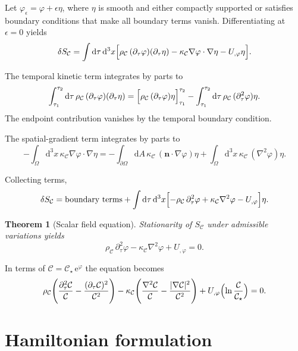 \documentclass[11pt,a4paper]{article}
\newtheorem{theorem}[axiom]{Theorem}
\newcommand{\C}{\mathcal{C}}
\newcommand{\Cs}{\mathcal{C}_\star}
\renewcommand{\dd}{\mathrm{d}}
\newcommand{\e}{\mathrm{e}}
\newcommand{\rhoC}{\rho_{\mathcal{C}}}
\newcommand{\kC}{\kappa_{\mathcal{C}}}
\newcommand{\Boxed}[1]{\boxed{\displaystyle #1}}
\begin{document}
Let \(\varphi_\epsilon=\varphi+\epsilon\eta\), where \(\eta\) is smooth and either compactly supported or satisfies boundary conditions that make all boundary terms vanish. Differentiating at \(\epsilon=0\) yields
\begin{equation}
\delta S_{\C}=\int\dd\tau\,\dd^3x\Bigl[\rhoC\,(\partial_\tau\varphi)(\partial_\tau\eta)-\kC\nabla\varphi\cdot\nabla\eta-U_{,\varphi}\eta\Bigr].
\end{equation}

The temporal kinetic term integrates by parts to
\begin{equation}
\int_{\tau_1}^{\tau_2}\dd\tau\,\rhoC\,(\partial_\tau\varphi)(\partial_\tau\eta)=\Bigl[\rhoC\,(\partial_\tau\varphi)\eta\Bigr]_{\tau_1}^{\tau_2}-\int_{\tau_1}^{\tau_2}\dd\tau\,\rhoC\,(\partial_\tau^2\varphi)\eta.
\end{equation}
The endpoint contribution vanishes by the temporal boundary condition.

The spatial-gradient term integrates by parts to
\begin{equation}
-\int_\Omega\dd^3x\,\kC\nabla\varphi\cdot\nabla\eta=-\int_{\partial\Omega}\dd A\,\kC\,(\mathbf{n}\cdot\nabla\varphi)\eta+\int_\Omega\dd^3x\,\kC\,(\nabla^2\varphi)\eta.
\end{equation}

Collecting terms,
\begin{equation}
\delta S_{\C}=\text{boundary terms}+\int\dd\tau\,\dd^3x\Bigl[-\rhoC\,\partial_\tau^2\varphi+\kC\nabla^2\varphi-U_{,\varphi}\Bigr]\eta.
\end{equation}

\begin{theorem}[Scalar field equation]
Stationarity of \(S_{\C}\) under admissible variations yields
\[
\Boxed{\rhoC\,\partial_\tau^2\varphi-\kC\nabla^2\varphi+U_{,\varphi}=0.}
\]
\end{theorem}

In terms of \(\C=\Cs\,\e^\varphi\) the equation becomes
\begin{equation}
\rhoC\Biggl(\frac{\partial_\tau^2\C}{\C}-\frac{(\partial_\tau\C)^2}{\C^2}\Biggr)
-\kC\Biggl(\frac{\nabla^2\C}{\C}-\frac{|\nabla\C|^2}{\C^2}\Biggr)
+U_{,\varphi}\Bigl(\ln\frac{\C}{\Cs}\Bigr)=0.
\end{equation}

\section{Hamiltonian formulation}
\end{document}
